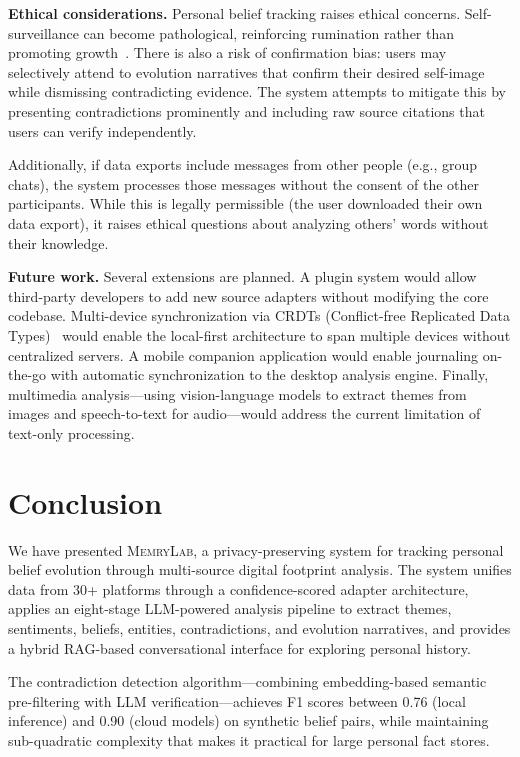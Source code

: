\documentclass[manuscript,review]{acmart}
\begin{document}
\textbf{Ethical considerations.}
Personal belief tracking raises ethical concerns.
Self-surveillance can become pathological, reinforcing rumination rather than promoting growth~\cite{ruckenstein2014beyond}.
There is also a risk of confirmation bias: users may selectively attend to evolution narratives that confirm their desired self-image while dismissing contradicting evidence.
The system attempts to mitigate this by presenting contradictions prominently and including raw source citations that users can verify independently.

Additionally, if data exports include messages from other people (e.g., group chats), the system processes those messages without the consent of the other participants.
While this is legally permissible (the user downloaded their own data export), it raises ethical questions about analyzing others' words without their knowledge.

\textbf{Future work.}
Several extensions are planned.
A plugin system would allow third-party developers to add new source adapters without modifying the core codebase.
Multi-device synchronization via CRDTs (Conflict-free Replicated Data Types)~\cite{shapiro2011crdt} would enable the local-first architecture to span multiple devices without centralized servers.
A mobile companion application would enable journaling on-the-go with automatic synchronization to the desktop analysis engine.
Finally, multimedia analysis---using vision-language models to extract themes from images and speech-to-text for audio---would address the current limitation of text-only processing.


\section{Conclusion}
\label{sec:conclusion}

We have presented \textsc{MemryLab}, a privacy-preserving system for tracking personal belief evolution through multi-source digital footprint analysis.
The system unifies data from 30+ platforms through a confidence-scored adapter architecture, applies an eight-stage LLM-powered analysis pipeline to extract themes, sentiments, beliefs, entities, contradictions, and evolution narratives, and provides a hybrid RAG-based conversational interface for exploring personal history.

The contradiction detection algorithm---combining embedding-based semantic pre-filtering with LLM verification---achieves F1 scores between 0.76 (local inference) and 0.90 (cloud models) on synthetic belief pairs, while maintaining sub-quadratic complexity that makes it practical for large personal fact stores.
\end{document}
